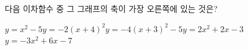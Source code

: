 \hspace*{2mm}\begin{minipage}[t]{\dimexpr\linewidth-2mm\relax}\vspace{0pt}
다음 이차함수 중 그 그래프의 축이 가장 오른쪽에 있는 것은?
\begin{choicesii}{$y=x^2-5$}{$y=-2(x+4)^2$}{$y=-4(x+3)^2-5$}{$y=2x^2+2x-3$}{$y=-3x^2+6x-7$}\end{choicesii}\end{minipage}
